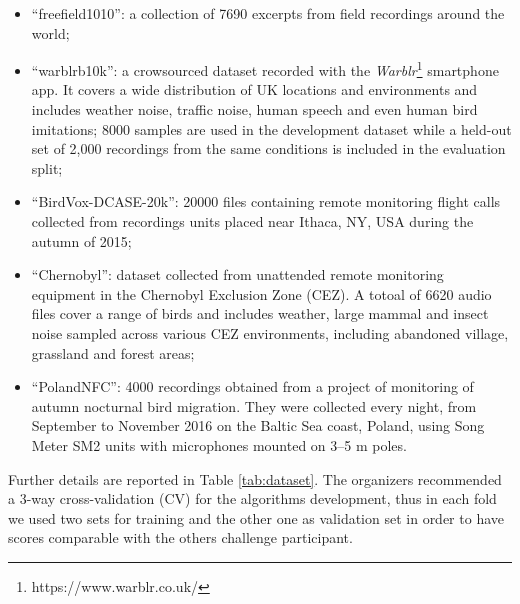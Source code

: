\begin{itemize}
	\item ``freefield1010'': a collection of 7690 excerpts from field recordings around the world;
	\item ``warblrb10k'': a crowsourced dataset recorded with the \textit{Warblr}\footnote{https://www.warblr.co.uk/} smartphone app. It covers a wide distribution of UK locations and environments and includes weather noise, traffic noise, human speech and even human bird imitations; 8000 samples are used in the development dataset while a held-out set of 2,000 recordings from the same conditions is included in the evaluation split;
	\item ``BirdVox-DCASE-20k'': 20000 files containing remote monitoring flight calls collected from  recordings units placed near Ithaca, NY, USA during the autumn of 2015;
	\item ``Chernobyl'': dataset collected from unattended remote monitoring equipment in the Chernobyl Exclusion Zone (CEZ). A totoal of 6620 audio files cover a range of birds and includes weather, large mammal and insect noise sampled across various CEZ environments, including abandoned village, grassland and forest areas;
	\item ``PolandNFC'': 4000 recordings obtained from a project of monitoring of autumn nocturnal bird migration. They were collected every night, from September to November 2016 on the Baltic Sea coast, Poland, using Song Meter SM2 units with microphones mounted on 3–5 m poles.
\end{itemize}
Further details are reported in Table \ref{tab:dataset}.
The organizers recommended a 3-way cross-validation (CV) for the algorithms development, thus in each fold we used two sets for training and the other one as validation set in order to have scores comparable with the others challenge participant.

